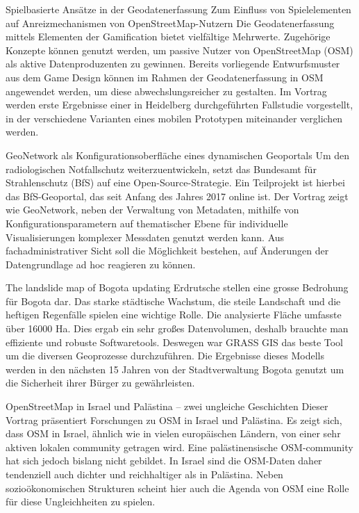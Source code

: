 %
{Spielbasierte Ansätze in der Geodatenerfassung}%
{Zum Einfluss von Spielelementen auf Anreizmechanismen von OpenStreetMap-Nutzern}%
{%
Die Geodatenerfassung mittels Elementen der Gamification bietet vielfältige Mehrwerte. Zugehörige Konzepte können genutzt werden, um passive Nutzer von OpenStreetMap (OSM) als aktive Datenproduzenten zu gewinnen. Bereits vorliegende Entwurfsmuster aus dem Game Design können im Rahmen der Geodatenerfassung in OSM angewendet werden, um diese abwechslungsreicher zu gestalten. Im Vortrag werden erste Ergebnisse einer in Heidelberg durchgeführten Fallstudie vorgestellt, in der verschiedene Varianten eines mobilen Prototypen miteinander verglichen werden.%
}

%
{GeoNetwork als Konfigurationsoberfläche eines dynamischen Geoportals}%
{}%
{%
Um den radiologischen Notfallschutz weiterzuentwickeln, setzt das Bundesamt für Strahlenschutz (BfS) auf eine Open-Source-Strategie. Ein Teilprojekt ist hierbei das BfS-Geoportal, das seit Anfang des Jahres 2017 online ist. 
Der Vortrag zeigt wie GeoNetwork, neben der Verwaltung von Metadaten, mithilfe von Konfigurationsparametern auf thematischer Ebene für individuelle Visualisierungen komplexer Messdaten genutzt werden kann. Aus fachadministrativer Sicht soll die Möglichkeit bestehen, auf Änderungen der Datengrundlage ad hoc reagieren zu können.%
}

%
{The landslide map of Bogota updating}%
{}%
{%
Erdrutsche stellen eine grosse Bedrohung für Bogota dar. Das starke städtische Wachstum, die steile Landschaft und die heftigen Regenfälle spielen eine wichtige Rolle. Die analysierte Fläche umfasste über 16000 Ha. Dies ergab ein sehr großes Datenvolumen, deshalb brauchte man effiziente und robuste Softwaretools. Deswegen war GRASS GIS das beste Tool um die diversen Geoprozesse durchzuführen. Die Ergebnisse dieses Modells werden in den nächsten 15 Jahren von der Stadtverwaltung Bogota genutzt um die Sicherheit ihrer Bürger zu gewährleisten.%
}

%
{OpenStreetMap in Israel und Palästina – zwei ungleiche Geschichten}%
{}%
{%
Dieser Vortrag präsentiert Forschungen zu OSM in Israel und Palästina. Es zeigt sich, dass OSM in Israel, ähnlich wie in vielen europäischen Ländern, von einer sehr aktiven lokalen community getragen wird. Eine palästinensische OSM-community hat sich jedoch bislang nicht gebildet. In Israel sind die OSM-Daten daher tendenziell auch dichter und reichhaltiger als in Palästina. Neben sozioökonomischen Strukturen scheint hier auch die Agenda von OSM eine Rolle für diese Ungleichheiten zu spielen.%
}


